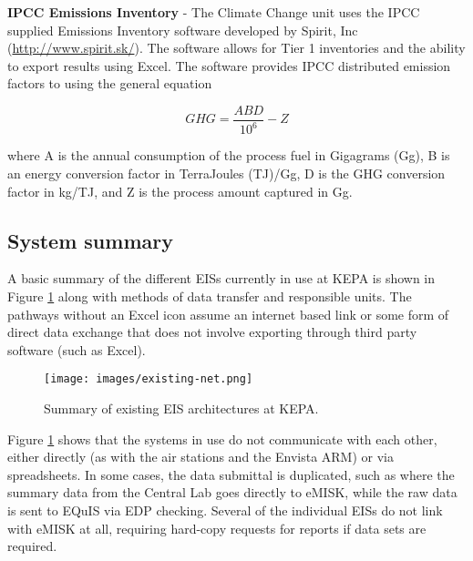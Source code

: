 \textbf{IPCC Emissions Inventory} - The Climate Change unit uses the IPCC supplied Emissions Inventory software developed by Spirit, Inc (\url{http://www.spirit.sk/}).  The software allows for Tier 1 inventories and the ability to export results using Excel. The software provides IPCC distributed emission factors to using the general equation

\begin{equation}
\label{eq:GHGei}
GHG = \frac{ABD}{10^{6}} - Z
\end{equation}

\noindent
where A is the annual consumption of the process fuel in Gigagrams (Gg), B is an energy conversion factor in TerraJoules (TJ)/Gg, D is the GHG conversion factor in kg/TJ, and Z is the process amount captured in Gg.

\subsection{System summary}
A basic summary of the different EISs currently in use at KEPA is shown in Figure \ref{fig:existing} along with methods of data transfer and responsible units. The pathways without an Excel icon assume an internet based link or some form of direct data exchange that does not involve exporting through third party software (such as Excel).

%
\begin{figure}[!htpb]
\centering
\texttt{[image: images/existing-net.png]} 
\caption{Summary of existing EIS architectures at KEPA.}
\label{fig:existing}
\end{figure}
%

Figure \ref{fig:existing} shows that the systems in use do not communicate with each other, either directly (as with the air stations and the Envista ARM) or via spreadsheets. In some cases, the data submittal is duplicated, such as where the summary data from the Central Lab goes directly to eMISK, while the raw data is sent to EQuIS via EDP checking. Several of the individual EISs do not link with eMISK at all, requiring hard-copy requests for reports if data sets are required.